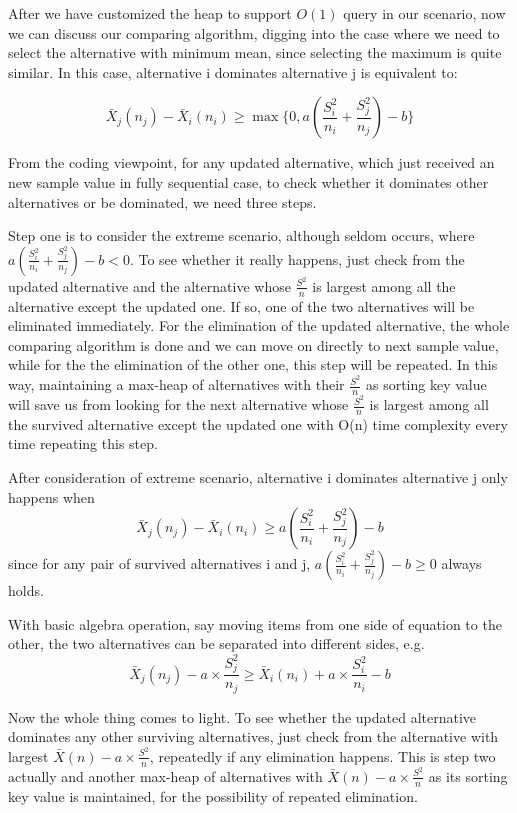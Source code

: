 \documentclass[12pt,a4paper]{report}
\begin{document}
After we have customized the heap to support $O(1)$ query in our scenario, now we can discuss our comparing algorithm, digging into the case where we need to select the alternative with minimum mean, since selecting the maximum is quite similar. In this case, alternative i dominates alternative j is equivalent to:

$$ \bar{X}_j(n_j)-\bar{X}_i(n_i) \ge \max\{0,a(\frac{S_i^2}{n_i}+\frac{S_j^2}{n_j}) - b\} $$

From the coding viewpoint, for any updated alternative, which just received an new sample value in fully sequential case, to check whether it dominates other alternatives or be dominated, we need three steps.

Step one is to consider the extreme scenario, although seldom occurs, where $a(\frac{S_i^2}{n_i}+\frac{S_j^2}{n_j}) - b < 0$. To see whether it really happens, just check from the updated alternative and the alternative whose $\frac{S^2}{n}$ is largest among all the alternative except the updated one. If so, one of the two alternatives will be eliminated immediately. For the elimination of the updated alternative, the whole comparing algorithm is done and we can move on directly to next sample value, while for the the elimination of the other one, this step will be repeated. In this way, maintaining a max-heap of alternatives with their $\frac{S^2}{n}$ as sorting key value will save us from looking for the next alternative whose $\frac{S^2}{n}$ is largest among all the survived alternative except the updated one with O(n) time complexity every time repeating this step.

After consideration of extreme scenario, alternative i dominates alternative j only happens when
$$ \bar{X}_j(n_j)-\bar{X}_i(n_i) \ge a(\frac{S_i^2}{n_i}+\frac{S_j^2}{n_j}) - b $$
since for any pair of survived alternatives i and j, $a(\frac{S_i^2}{n_i}+\frac{S_j^2}{n_j}) - b \ge 0$ always holds.

With basic algebra operation, say moving items from one side of equation to the other, the two alternatives can be separated into different sides, e.g.
$$ \bar{X}_j(n_j) - a \times \frac{S_j^2}{n_j} \ge \bar{X}_i(n_i) + a \times \frac{S_i^2}{n_i} - b $$

Now the whole thing comes to light. To see whether the updated alternative dominates any other surviving alternatives, just check from the alternative with largest $\bar{X}(n) - a \times \frac{S^2}{n}$, repeatedly if any elimination happens. This is step two actually and another max-heap of alternatives with $\bar{X}(n) - a \times \frac{S^2}{n}$ as its sorting key value is maintained, for the possibility of repeated elimination.
\end{document}
